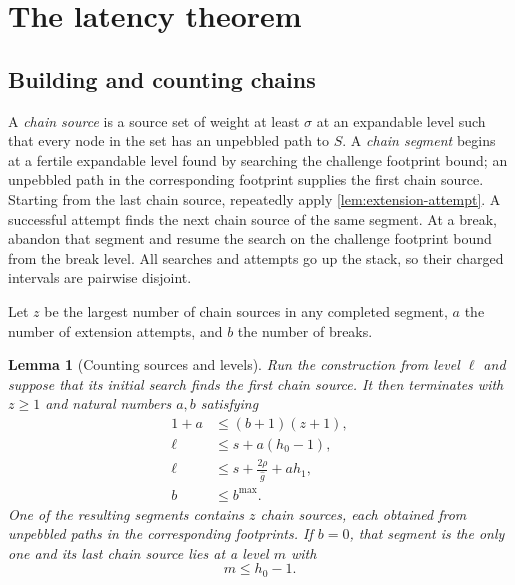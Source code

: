 \documentclass[11pt]{article}
\theoremstyle{plain}
\newtheorem{lemma}{Lemma}
\theoremstyle{remark}
\newcommand{\ghat}{\widehat g}
\begin{document}
\section{The latency theorem}
\label{sec:latency}
\subsection{Building and counting chains}

A \emph{chain source} is a source set of weight at least \(\sigma\) at an expandable
level such that every node in the set has an unpebbled path to \(S\).
A \emph{chain segment} begins at a fertile expandable level found by searching the
challenge footprint bound; an unpebbled path in the corresponding footprint
supplies the first chain source.  Starting from the last chain source, repeatedly
apply \cref{lem:extension-attempt}.  A successful attempt finds the next chain source
of the same segment.  At a break, abandon that segment and resume the search on
the challenge footprint bound from the break level.  All searches and attempts go up
the stack, so their charged intervals are pairwise disjoint.

Let \(z\) be the largest number of chain sources in any completed segment, \(a\) the number
of extension attempts, and \(b\) the number of breaks.

\begin{lemma}[Counting sources and levels]
\label{lem:global-ledger}
Run the construction from level \(\ell\) and suppose that its initial search finds the
first chain source.  It then terminates with
\(z\ge1\) and natural numbers \(a,b\) satisfying
\begin{align}
 1+a&\le(b+1)(z+1),
 \label{eq:segment-ledger}\\
 \ell&\le s+a(h_0-1),
 \label{eq:level-ledger}\\
 \ell&\le s+\frac{2\rho}{\ghat}+a h_1,
 \label{eq:global-level-ledger}\\
 b&\le b^{\max} .
 \label{eq:break-ledger}
\end{align}
One of the resulting segments contains \(z\) chain sources, each obtained from
unpebbled paths in the corresponding footprints.  If \(b=0\), that segment is the only one and its
last chain source lies at a level \(m\)
with
\begin{equation}
 m\le h_0-1 .
 \label{eq:last-source-depth}
\end{equation}
\end{lemma}
\end{document}
